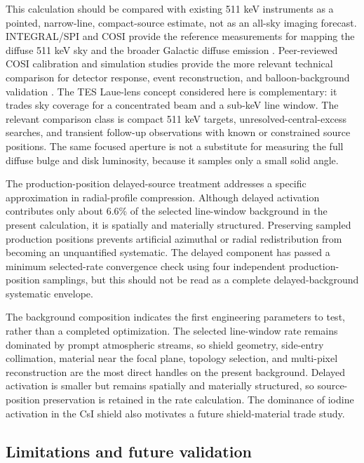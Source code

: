\documentclass[11pt]{article}
\begin{document}
This calculation should be compared with existing 511 keV instruments as a pointed, narrow-line, compact-source estimate, not as an all-sky imaging forecast. INTEGRAL/SPI and COSI provide the reference measurements for mapping the diffuse 511 keV sky and the broader Galactic diffuse emission \cite{Siegert2016AA,Kierans2020,Siegert2020COSI,Yoneda2025,Karwin2023}. Peer-reviewed COSI calibration and simulation studies provide the more relevant technical comparison for detector response, event reconstruction, and balloon-background validation \cite{Beechert2022,Sleator2019,Gallego2025Balloon,Gallego2025,Ciabattoni2025ACS}. The TES Laue-lens concept considered here is complementary: it trades sky coverage for a concentrated beam and a sub-keV line window. The relevant comparison class is compact 511 keV targets, unresolved-central-excess searches, and transient follow-up observations with known or constrained source positions. The same focused aperture is not a substitute for measuring the full diffuse bulge and disk luminosity, because it samples only a small solid angle.

The production-position delayed-source treatment addresses a specific approximation in radial-profile compression. Although delayed activation contributes only about 6.6\% of the selected line-window background in the present calculation, it is spatially and materially structured. Preserving sampled production positions prevents artificial azimuthal or radial redistribution from becoming an unquantified systematic. The delayed component has passed a minimum selected-rate convergence check using four independent production-position samplings, but this should not be read as a complete delayed-background systematic envelope.

The background composition indicates the first engineering parameters to test, rather than a completed optimization. The selected line-window rate remains dominated by prompt atmospheric streams, so shield geometry, side-entry collimation, material near the focal plane, topology selection, and multi-pixel reconstruction are the most direct handles on the present background. Delayed activation is smaller but remains spatially and materially structured, so source-position preservation is retained in the rate calculation. The dominance of iodine activation in the CsI shield also motivates a future shield-material trade study.

\subsection{Limitations and future validation}
\label{subsec:limitations}
\end{document}
